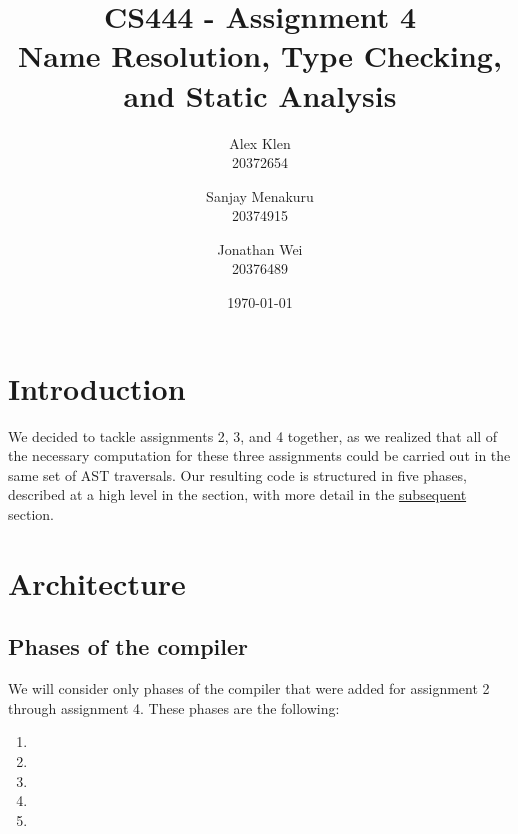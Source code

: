 \documentclass[12pt, titlepage]{article}
\newcommand{\assignmentNumber}{Assignment 4}
\newcommand{\courseName}{CS 444}
\begin{document}
\pagestyle{fancyplain}
\thispagestyle{plain}

\fancyhead{}
\fancyfoot{}
\chead{\fancyplain{}{\assignmentNumber}}
\lhead{\fancyplain{}{\courseName}}

\title{CS444 - \assignmentNumber\\Name Resolution, Type Checking, and Static Analysis}
\date{\today}
\author{Alex Klen\\20372654\and Sanjay Menakuru\\20374915\and Jonathan Wei\\20376489}

\maketitle

\section{Introduction}

We decided to tackle assignments 2, 3, and 4 together, as we realized that all
of the necessary computation for these three assignments could be carried out
in the same set of AST traversals. Our resulting code is structured in five
phases, described at a high level in the  section, with more
detail in the \hyperref[sec:assg]{subsequent} section.

\section{Architecture}\label{sec:arch}

\subsection{Phases of the compiler}

We will consider only phases of the compiler that were added for assignment 2
through assignment 4. These phases are the following:
\begin{enumerate}
  \item {}
  \item {}
  \item {}
  \item {}
  \item {}
\end{enumerate}
\end{document}
